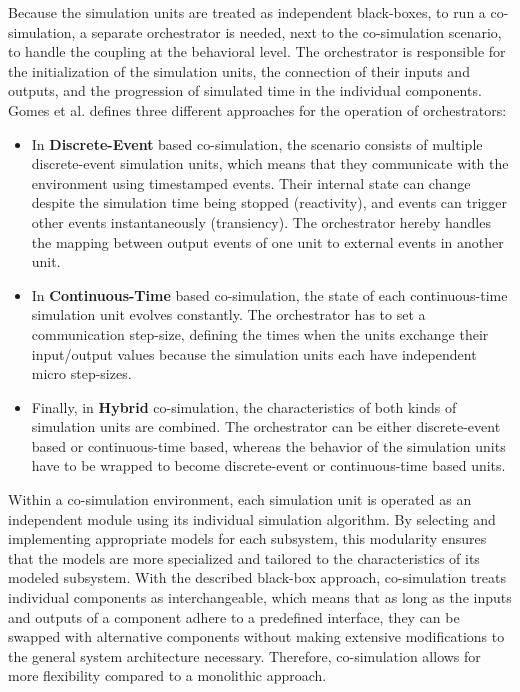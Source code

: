 Because the simulation units are treated as independent black-boxes, to run a co-simulation, a separate orchestrator is needed, next to the co-simulation scenario, to handle the coupling at the behavioral level. The orchestrator is responsible for the initialization of the simulation units, the connection of their inputs and outputs, and the progression of simulated time in the individual components. Gomes et al. \cite{gomes2018co} defines three different approaches for the operation of orchestrators:
\begin{itemize}
    \item[] In \textbf{Discrete-Event} based co-simulation, the scenario consists of multiple discrete-event simulation units, which means that they communicate with the environment using timestamped events. Their internal state can change despite the simulation time being stopped (reactivity), and events can trigger other events instantaneously (transiency). The orchestrator hereby handles the mapping between output events of one unit to external events in another unit.
    \item[] In \textbf{Continuous-Time} based co-simulation, the state of each continuous-time simulation unit evolves constantly. The orchestrator has to set a communication step-size, defining the times when the units exchange their input/output values because the simulation units each have independent micro step-sizes.
    \item[] Finally, in \textbf{Hybrid} co-simulation, the characteristics of both kinds of simulation units are combined. The orchestrator can be either discrete-event based or continuous-time based, whereas the behavior of the simulation units have to be wrapped to become discrete-event or continuous-time based units.
\end{itemize}

Within a co-simulation environment, each simulation unit is operated as an independent module using its individual simulation algorithm. By selecting and implementing appropriate models for each subsystem, this modularity ensures that the models are more specialized and tailored to the characteristics of its modeled subsystem. With the described black-box approach, co-simulation treats individual components as interchangeable, which means that as long as the inputs and outputs of a component adhere to a predefined interface, they can be swapped with alternative components without making extensive modifications to the general system architecture necessary. Therefore, co-simulation allows for more flexibility compared to a monolithic approach.

